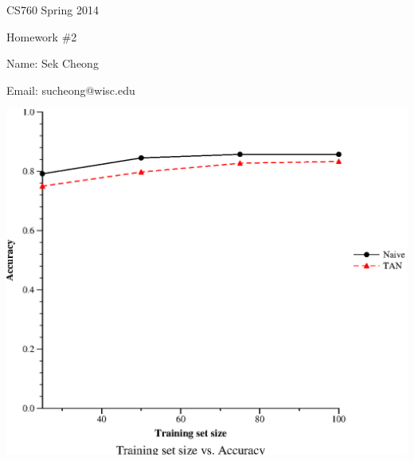 \documentclass[12pt]{article}
\begin{document}
\begin{center}
	{\large 
CS760 Spring 2014

Homework \#2
}
\end{center}

\begin{flushleft}
Name: Sek Cheong

Email: sucheong@wisc.edu
\end{flushleft}

\bigskip 
\begin{center}
\includegraphics{part2.eps}
\end{center}
\end{document}
